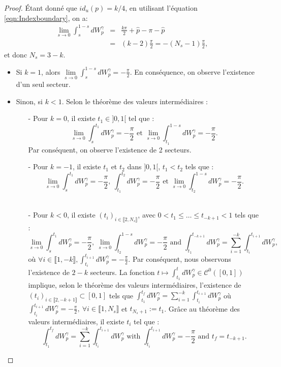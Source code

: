 \begin{proof}
Étant donné que $id_u(p)=k/4$, en utilisant l'équation \eqref{eqn:Indexboundary}, on a:
\begin{eqnarray*}
    \lim\limits_{s\rightarrow 0}\displaystyle\int_s^{1-s} dW_p^\gamma&=&\frac{k\pi}{2}+\hat{p}-\pi-\hat{p}\\
    &=&(k-2)\frac{\pi}{2}=-(N_s-1)\frac{\pi}{2},
\end{eqnarray*}
et donc $N_s=3-k$.
\begin{itemize}
\item Si $k=1$, alors $\lim\limits_{s\rightarrow 0}\displaystyle\int_s^{1-s} dW_p^\gamma= -\frac{\pi}{2}$. En conséquence, on observe l'existence d'un seul secteur.\vspace{0.1cm}
\item Sinon, si $k<1$. Selon le théorème des valeurs intermédiaires :\vspace{0.1cm}
\begin{itemize}
\item[-] Pour $k=0$, il existe $t_1\in]0, 1[$ tel que :
$$\lim\limits_{s\rightarrow 0}\displaystyle\int_s^{t_1} dW_p^\gamma= -\frac{\pi}{2} \mbox{ et } \lim\limits_{s\rightarrow 0}\displaystyle\int_{t_1}^{1-s} dW_p^\gamma= -\frac{\pi}{2}.$$
Par conséquent, on observe l'existence de 2 secteurs.\vspace{0.1cm}
\item[-] Pour $k=-1$, il existe $t_1$ et $t_2$ dans $]0, 1[$, $t_1<t_2$ tels que :
$$\lim\limits_{s\rightarrow 0}\displaystyle\int_s^{t_1} dW_p^\gamma= -\frac{\pi}{2},~ \int_{t_1}^{t_2}dW^\gamma_p=-\frac{\pi}{2} \mbox{ et } \lim\limits_{s\rightarrow 0}\displaystyle\int_{t_2}^{1-s} dW_p^\gamma= -\frac{\pi}{2}.$$\\\vspace{0.1cm}
\item[-] Pour $k<0$, il existe $(t_i)_{i\in\llbracket2, N_s\rrbracket}$, avec $0<t_1\leq\dots\leq t_{-k+1}<1$ tels que :
$$\lim\limits_{s\rightarrow 0}\displaystyle\int_s^{t_1} dW_p^\gamma= -\frac{\pi}{2},~ \lim\limits_{s\rightarrow 0}\displaystyle\int_{t_2}^{1-s} dW_p^\gamma= -\frac{\pi}{2} \mbox{ and } \int_{t_1}^{t_{-k+1}}dW^\gamma_p=\sum_{i=1}^{-k}\displaystyle\int_{t_i}^{t_{i+1}} dW_p^\gamma,$$
où $\forall i\in\llbracket 1, -k\rrbracket, \displaystyle\int_{t_i}^{t_{i+1}} dW_p^\gamma=-\frac{\pi}{2}.$
Par conséquent, nous observons l'existence de $2-k$ secteurs.
La fonction $t\longmapsto\displaystyle\int_{t_1}^t dW_p^\gamma\in\mathcal{C}^0([0,1])$ implique, selon le théorème des valeurs intermédiaires, l'existence de $(t_i)_{i\in\llbracket2, -k+1\rrbracket}\subset[0, 1]$ tels que $\displaystyle\int_{t_1}^{t_f} dW_p^\gamma=\sum_{i=1}^{-k}\displaystyle\int_{t_i}^{t_{i+1}}dW_p^\gamma$ où $\displaystyle\int_{t_i}^{t_{i+1}}dW_p^\gamma=-\frac{\pi}{2},~\forall i\in\llbracket1, N_s\rrbracket$ et $t_{N_s+1}:=t_1$.
Grâce au théorème des valeurs intermédiaires, il existe $t_i$ tel que :
$$\displaystyle\int_{t_1}^{t_f} dW_p^\gamma= \sum_{i=1}^{-k}\displaystyle\int_{t_i}^{t_{i+1}} dW_p^\gamma \mbox{ with } \displaystyle\int_{t_i}^{t_{i+1}} dW_p^\gamma=-\frac{\pi}{2}\mbox{ and } t_f=t_{-k+1}.$$
\end{itemize}
\end{itemize}
\end{proof}
